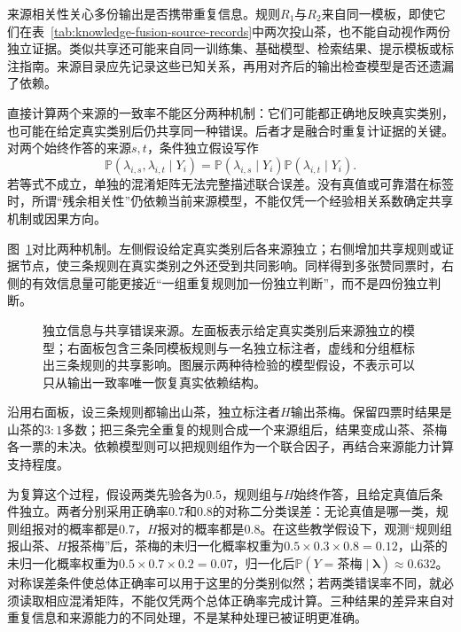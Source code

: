 来源相关性关心多份输出是否携带重复信息。规则$R_1$与$R_2$来自同一模板，即使它们在表~\ref{tab:knowledge-fusion-source-records}中两次投山茶，也不能自动视作两份独立证据。类似共享还可能来自同一训练集、基础模型、检索结果、提示模板或标注指南。来源目录应先记录这些已知关系，再用对齐后的输出检查模型是否还遗漏了依赖。

直接计算两个来源的一致率不能区分两种机制：它们可能都正确地反映真实类别，也可能在给定真实类别后仍共享同一种错误。后者才是融合时重复计证据的关键。对两个始终作答的来源$s,t$，条件独立假设写作
\begin{equation}
  \mathbb{P}(\lambda_{i,s},\lambda_{i,t}\mid Y_i)
  =
  \mathbb{P}(\lambda_{i,s}\mid Y_i)
  \mathbb{P}(\lambda_{i,t}\mid Y_i).
  \label{eq:knowledge-fusion-conditional-independence}
\end{equation}
若等式不成立，单独的混淆矩阵无法完整描述联合误差。没有真值或可靠潜在标签时，所谓“残余相关性”仍依赖当前来源模型，不能仅凭一个经验相关系数确定共享机制或因果方向。

图~\ref{fig:knowledge-fusion-source-dependence}对比两种机制。左侧假设给定真实类别后各来源独立；右侧增加共享规则或证据节点，使三条规则在真实类别之外还受到共同影响。同样得到多张赞同票时，右侧的有效信息量可能更接近“一组重复规则加一份独立判断”，而不是四份独立判断。

\begin{figure}[htbp]
  \centering
  
  \caption{独立信息与共享错误来源。左面板表示给定真实类别后来源独立的模型；右面板包含三条同模板规则与一名独立标注者，虚线和分组框标出三条规则的共享影响。图展示两种待检验的模型假设，不表示可以只从输出一致率唯一恢复真实依赖结构。}
  \label{fig:knowledge-fusion-source-dependence}
\end{figure}
\FloatBarrier

沿用右面板，设三条规则都输出山茶，独立标注者$H$输出茶梅。保留四票时结果是山茶的$3:1$多数；把三条完全重复的规则合成一个来源组后，结果变成山茶、茶梅各一票的未决。依赖模型则可以把规则组作为一个联合因子，再结合来源能力计算支持程度。

为复算这个过程，假设两类先验各为$0.5$，规则组与$H$始终作答，且给定真值后条件独立。两者分别采用正确率$0.7$和$0.8$的对称二分类误差：无论真值是哪一类，规则组报对的概率都是$0.7$，$H$报对的概率都是$0.8$。在这些教学假设下，观测“规则组报山茶、$H$报茶梅”后，茶梅的未归一化概率权重为$0.5\times0.3\times0.8=0.12$，山茶的未归一化概率权重为$0.5\times0.7\times0.2=0.07$，归一化后$\mathbb{P}(Y=\text{茶梅}\mid\bm{\lambda})\approx0.632$。对称误差条件使总体正确率可以用于这里的分类别似然；若两类错误率不同，就必须读取相应混淆矩阵，不能仅凭两个总体正确率完成计算。三种结果的差异来自对重复信息和来源能力的不同处理，不是某种处理已被证明更准确。

